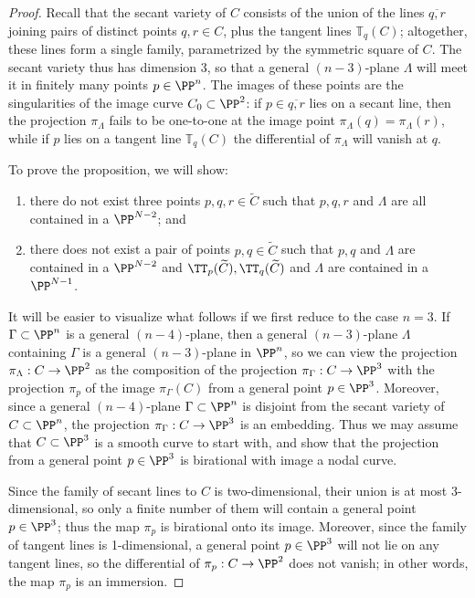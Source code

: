 \begin{proof} Recall that the secant variety of $C$ consists of the union of the lines $\overline{q,r}$ joining pairs of distinct points $q,r \in C$, plus the tangent lines ${\mathbb T}_q(C)$; altogether, these lines form a single family, parametrized by the symmetric square of $C$. The secant variety thus has dimension 3, so that a general $(n-3)$-plane $\Lambda$ will meet it in finitely many points $p \in \PP^n$. The images of these points are the singularities of the image curve $C_0 \subset \PP^2$: if $p \in \overline{q,r}$ lies on a secant line, then the projection $\pi_\Lambda$ fails to be one-to-one at the image point $\pi_\Lambda(q) = \pi_\Lambda(r)$, while if $p$ lies on a tangent line ${\mathbb T}_q(C)$ the differential of $\pi_\Lambda$ will vanish at $q$.

To prove the proposition, we will show:
\begin{enumerate}\label{needed for nodes}
\item there do not exist three points $p,q,r \in \widetilde C$ such that $p, q, r$ and $\Lambda$ are all contained in a $\PP^{N-2}$; and
\item there does not exist a pair of points $p, q \in \widetilde C$ such that 
$p, q$ and $\Lambda$ are contained in a $\PP^{N-2}$ and $\TT_p(\widetilde C), \TT_q(\widetilde C)$ and $\Lambda$ are contained in a $\PP^{N-1}$.
\end{enumerate}

It will be easier to visualize what follows if we first reduce to the case $n=3$. If $\Gamma \subset \PP^n$ is a general $(n-4)$-plane, then a general $(n-3)$-plane $\Lambda$ containing $\Gamma$ is a general $(n-3)$-plane in $\PP^n$, so we can view the projection $\pi_\Lambda : C \to \PP^2$ as the composition of the projection $\pi_\Gamma : C \to \PP^3$ with the projection $\pi_p$ of the image $\pi_\Gamma(C)$ from a general point $p \in \PP^3$. Moreover, since a general  $(n-4)$-plane $\Gamma \subset \PP^n$ is disjoint from the secant variety of $C \subset \PP^n$, the projection $\pi_\Gamma : C \to \PP^3$ is an embedding. Thus we may assume that $C \subset \PP^3$ is a smooth curve to start with, and show that the projection from a general point $p \in \PP^3$
is birational with image a nodal curve.


Since the family of secant lines to $C$ is two-dimensional,  their union is at most 3-dimensional, so only a finite number of them will contain a general point $p \in \PP^3$; thus the map $\pi_p$ is birational onto its image. Moreover, since the family of tangent lines is 1-dimensional, a general point $p \in \PP^3$ will not lie on any tangent lines, so the differential of $\pi_p : C \to \PP^2$ does not vanish; in other words, the map $\pi_p$ is an immersion.


\end{proof}
